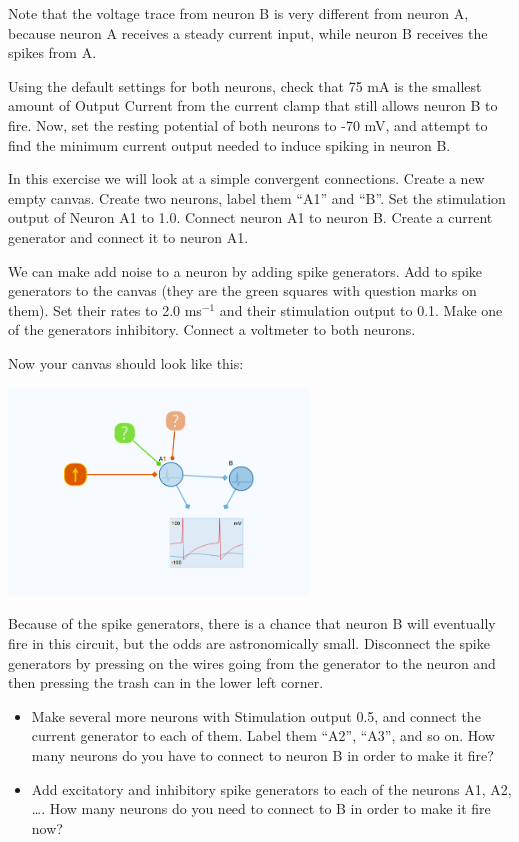 \begin{Exercise}[title=Small Networks]
\begin{ExePart}
Note that the voltage trace from neuron B is very different from neuron A, because neuron A receives a steady current input, while neuron B receives the spikes from A. 

Using the default settings for both neurons, check that 75 mA is the smallest amount of Output Current from the current clamp that still allows neuron B to fire. Now, set the resting potential of both neurons to -70 mV, and attempt to find the minimum current output needed to induce spiking in neuron B.
\end{ExePart}

\begin{ExePart}
In this exercise we will look at a simple convergent connections. Create a new empty canvas. Create two neurons, label them ``A1'' and ``B''. Set the stimulation output of Neuron A1 to 1.0. Connect neuron A1 to neuron B. Create a current generator and connect it to neuron A1. 

We can make add noise to a neuron by adding spike generators. Add to spike generators to the canvas (they are the green squares with question marks on them). Set their rates to 2.0 ms$^{-1}$ and their stimulation output to 0.1. Make one of the generators inhibitory. Connect a voltmeter to both neurons. 

Now your canvas should look like this: 
\begin{center}
\includegraphics[width=8cm]{two_neurons_noise.png}
\end{center}

Because of the spike generators, there is a chance that neuron B will eventually fire in this circuit, but the odds are astronomically small. Disconnect the spike generators by pressing on the wires going from the generator to the neuron and then pressing the trash can in the lower left corner. 
\begin{itemize}
\item Make several more neurons with Stimulation output 0.5, and connect the current generator to each of them. Label them ``A2'', ``A3'', and so on. How many neurons do you have to connect to neuron B in order to make it fire? 

\item Add excitatory and inhibitory spike generators to each of the neurons A1, A2, \dots. How many neurons do you need to connect to B in order to make it fire now?
\end{itemize}
\end{ExePart}



\end{Exercise}
